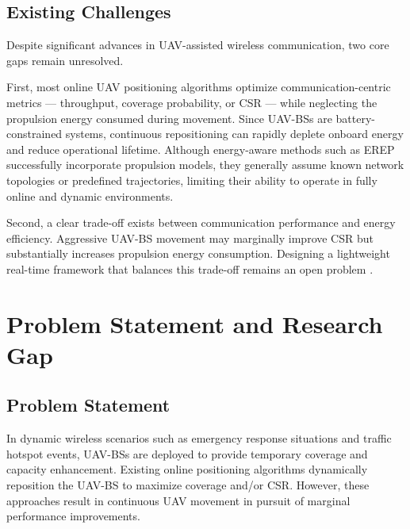 \documentclass[12pt]{report}
\begin{document}
\section{Existing Challenges}

Despite significant advances in UAV-assisted wireless communication, two core gaps remain unresolved.

First, most online UAV positioning algorithms optimize communication-centric metrics --- throughput, coverage probability, or CSR --- while neglecting the propulsion energy consumed during movement. Since UAV-BSs are battery-constrained systems, continuous repositioning can rapidly deplete onboard energy and reduce operational lifetime. Although energy-aware methods such as EREP successfully incorporate propulsion models, they generally assume known network topologies or predefined trajectories, limiting their ability to operate in fully online and dynamic environments.

Second, a clear trade-off exists between communication performance and energy efficiency. Aggressive UAV-BS movement may marginally improve CSR but substantially increases propulsion energy consumption. Designing a lightweight real-time framework that balances this trade-off remains an open problem \cite{pijnappel2024online, erep2020}.

\enlargethispage{2\baselineskip}

\chapter{Problem Statement and Research Gap}
\label{ch:problem}

\section{Problem Statement}

In dynamic wireless scenarios such as emergency response situations and traffic hotspot events, UAV-BSs are deployed to provide temporary coverage and capacity enhancement. Existing online positioning algorithms \cite{pijnappel2024online} dynamically reposition the UAV-BS to maximize coverage and/or CSR. However, these approaches result in continuous UAV movement in pursuit of marginal performance improvements.
\end{document}
